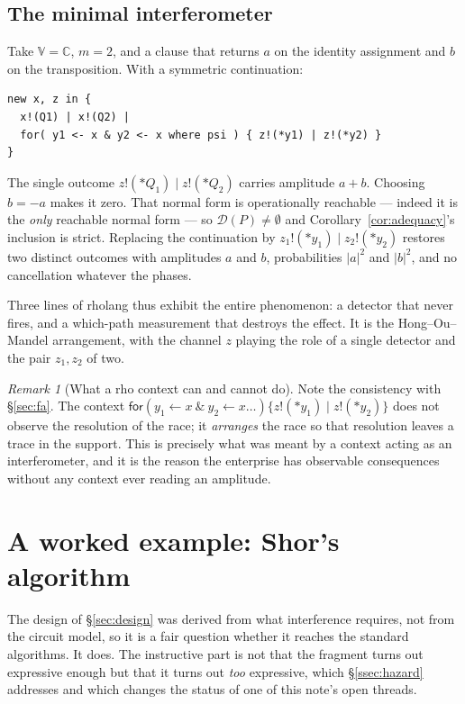 \documentclass[11pt,a4paper]{article}
\theoremstyle{plain}
\theoremstyle{definition}
\theoremstyle{remark}
\newtheorem{remark}[theorem]{Remark}
\newcommand{\V}{\mathbb{V}}
\newcommand{\Cx}{\mathbb{C}}
\begin{document}
\subsection{The minimal interferometer}

Take $\V = \Cx$, $m = 2$, and a clause that returns $a$ on the identity
assignment and $b$ on the transposition. With a symmetric continuation:

\begin{lstlisting}
new x, z in {
  x!(Q1) | x!(Q2) |
  for( y1 <- x & y2 <- x where psi ) { z!(*y1) | z!(*y2) }
}
\end{lstlisting}

The single outcome $z!(*Q_1) \mid z!(*Q_2)$ carries amplitude $a + b$. Choosing
$b = -a$ makes it zero. That normal form is operationally reachable --- indeed it
is the \emph{only} reachable normal form --- so
$\mathcal{D}(P) \neq \emptyset$ and Corollary~\ref{cor:adequacy}'s inclusion is
strict. Replacing the continuation by $z_1!(*y_1) \mid z_2!(*y_2)$ restores two
distinct outcomes with amplitudes $a$ and $b$, probabilities $|a|^2$ and $|b|^2$,
and no cancellation whatever the phases.

Three lines of rholang thus exhibit the entire phenomenon: a detector that never
fires, and a which-path measurement that destroys the effect. It is the
Hong--Ou--Mandel arrangement, with the channel $z$ playing the role of a single
detector and the pair $z_1,z_2$ of two.

\begin{remark}[What a rho context can and cannot do]\label{rem:back-to-fa}
Note the consistency with \S\ref{sec:fa}. The context
$\textsf{for}(y_1 \leftarrow x\ \&\ y_2 \leftarrow x \dots)\{z!(*y_1)\mid z!(*y_2)\}$
does not observe the resolution of the race; it \emph{arranges} the race so that
resolution leaves a trace in the support. This is precisely what was meant by a
context acting as an interferometer, and it is the reason the enterprise has
observable consequences without any context ever reading an amplitude.
\end{remark}

\section{A worked example: Shor's algorithm}\label{sec:shor}

The design of \S\ref{sec:design} was derived from what interference requires,
not from the circuit model, so it is a fair question whether it reaches the
standard algorithms. It does. The instructive part is not that the fragment turns
out expressive enough but that it turns out \emph{too} expressive, which
\S\ref{ssec:hazard} addresses and which changes the status of one of this note's
open threads.
\end{document}
